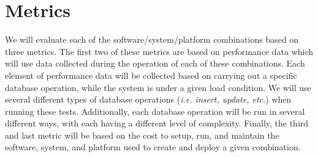 



\section{Metrics}
We will evaluate each of the software/system/platform combinations based on three metrics.  The first two of these metrics are based on performance data which will use data collected during the operation of each of these combinations.  Each element of performance data will be collected based on carrying out a specific database operation, while the system is under a given load condition.  We will use several different types of database operations (\emph{i.e. insert, update, etc.}) when running these tests.  Additionally, each database operation will be run in several different ways, with each having a different level of complexity.  Finally, the third and last metric will be based on the cost to setup, run, and maintain the software, system, and platform used to create and deploy a given combination.  

